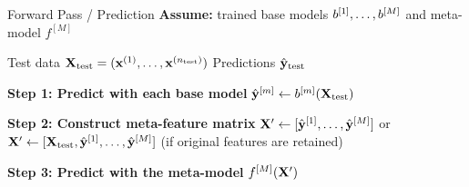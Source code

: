\documentclass[11pt,compress,t,notes=noshow, xcolor=table]{beamer}
\begin{document}




\begin{vbframe}{Forward Pass / Prediction}
\textbf{Assume:} trained base models $b^{[1]}, \dots, b^{[M]}$ and meta-model $f^{[M]}$

\begin{algorithmic}
    \Require Test data $\mathbf{X}_{\text{test}} = (\mathbf{x}^{(1)}, \dots, \mathbf{x}^{(n_{\text{test}})})$
    \Ensure Predictions $\hat{\mathbf{y}}_{\text{test}}$

    \State \textbf{Step 1: Predict with each base model}
        \State $\hat{\mathbf{y}}^{[m]} \leftarrow b^{[m]}(\mathbf{X}_{\text{test}})$
    \EndFor

    \State
    \State \textbf{Step 2: Construct meta-feature matrix}
    \State $\mathbf{X}^\prime \leftarrow [\hat{\mathbf{y}}^{[1]}, \dots, \hat{\mathbf{y}}^{[M]}]$ or $\mathbf{X}^\prime \leftarrow [\mathbf{X}_{\text{test}}, \hat{\mathbf{y}}^{[1]}, \dots, \hat{\mathbf{y}}^{[M]}]$ (if original features are retained)

    \State
    \State \textbf{Step 3: Predict with the meta-model}
    \State \Return $f^{[M]}(\mathbf{X}^\prime)$
\end{algorithmic}
\end{vbframe}
\end{document}
